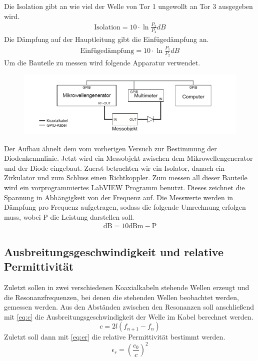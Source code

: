 Die Isolation gibt an wie viel der Welle von Tor 1 ungewollt an Tor 3 ausgegeben wird.
\begin{align}
\text{Isolation} = 10\cdot \ln{\frac{P_2}{P_4}}dB
\label{IsoF}
\end{align}
Die Dämpfung auf der Hauptleitung gibt die Einfügedämpfung an. 
\begin{align}
\text{Einfügedämpfung} = 10\cdot \ln{\frac{P_1}{P_2}}dB
\label{EinF}
\end{align}
Um die Bauteile zu messen wird folgende Apparatur verwendet.
\begin{figure}[h!]
	\centering
	\includegraphics[scale = 1]{Mess.PNG}
	\caption{}
	\label{}
\end{figure}
Der Aufbau ähnelt dem vom vorherigen Versuch zur Bestimmung der Diodenkennnlinie. Jetzt wird ein Messobjekt zwischen dem Mikrowellengenerator und der Diode eingebaut. Zuerst betrachten wir ein Isolator, danach ein Zirkulator und zum Schluss einen Richtkoppler. Zum messen all dieser Bauteile wird ein vorprogrammiertes LabVIEW Programm benutzt. Dieses zeichnet die Spannung in Abhängigkeit von der Frequenz auf. Die Messwerte werden in Dämpfung pro Frequenz aufgetragen, sodass die folgende Umrechnung erfolgen muss, wobei P die Leistung darstellen soll.
\begin{align}
\text{dB} = 10\text{dBm} - \text{P}
\label{F1}
\end{align}

\subsection{Ausbreitungsgeschwindigkeit und relative Permittivität}
Zuletzt sollen in zwei verschiedenen Koaxialkabeln stehende Wellen erzeugt und die Resonanzfrequenzen, bei denen die stehenden Wellen beobachtet werden, gemessen werden. Aus den Abständen zwischen den Resonanzen soll anschließend mit \cref{eq:c} die Ausbreitungsgeschwindigkeit der Welle im Kabel berechnet werden.
\begin{equation}
c = 2l(f_{n+1} - f_n)
\label{eq:c}
\end{equation}
Zuletzt soll dann mit \cref{eq:er} die relative Permittivität bestimmt werden.
\begin{equation}
\epsilon_r = \left( \frac{c_0}{c}\right) ^2
\label{eq:er}
\end{equation}

